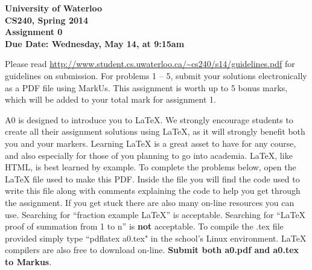 \documentclass[12pt]{article}
\begin{document}
\begin{center}
{\Large\bf University of Waterloo}\\
\vspace{3mm}
{\Large\bf CS240, Spring 2014}\\
\vspace{2mm}
{\Large\bf Assignment 0}\\
\vspace{3mm}
\textbf{Due Date: Wednesday, May 14, at 9:15am}
\end{center}

\def\question#1{\item[\bf #1.]}
\def\part#1{\item[\bf #1)]}
\newcommand{\pc}[1]{\mbox{\textbf{#1}}} %

Please read
\url{http://www.student.cs.uwaterloo.ca/~cs240/s14/guidelines.pdf}
for guidelines on submission.  For problems 1 -- 5, submit your
solutions electronically as a PDF file using MarkUs.
This assignment is worth up to 5 bonus marks, which will be added to
your total mark for assignment 1.


A0 is designed to introduce you to \LaTeX{}.
We strongly encourage students to create all their assignment solutions using \LaTeX{},
as it will strongly benefit both you and your markers. Learning \LaTeX{} is a great asset
to have for any course, and also especially for those of you planning to go into academia.
\LaTeX{}, like HTML, is best learned by example. To complete the problems below, open the
\LaTeX{} file used to make this PDF. Inside the file you will find the code used to write this
file along with comments explaining the code to help you get through the assignment. If you get
stuck there are also many on-line resources you can use. Searching for ``fraction example \LaTeX{}''
is acceptable. Searching for ``\LaTeX{} proof of summation from 1 to n''
is {\bf not} acceptable. To compile the .tex file provided simply type ``pdflatex a0.tex"
in the school's Linux environment. \LaTeX{}  compilers are also free to download on-line.
{\bf Submit both a0.pdf and a0.tex to Markus}.
\end{document}
